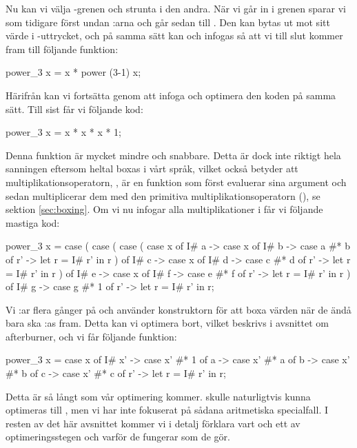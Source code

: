\documentclass[../Optimise]{subfiles}
\begin{document}
Nu kan vi välja -grenen och strunta i den andra. När vi går in i grenen
sparar vi som tidigare först undan :arna och går sedan till .
Den kan bytas ut mot sitt värde i -uttrycket, och på samma sätt  kan 
och  infogas så att vi till slut kommer fram till följande funktion:

\begin{codeEx}
power_3 x = x * power (3-1) x;
\end{codeEx}

Härifrån kan vi fortsätta genom att infoga  och optimera den
koden på samma sätt. Till sist får vi följande kod:

\begin{codeEx}
power_3 x = x * x * x * 1;
\end{codeEx}

Denna funktion är mycket mindre och snabbare.
Detta är dock inte riktigt hela sanningen eftersom heltal boxas i vårt språk, vilket
också betyder att multiplikationsoperatorn, \ic{*}, är en funktion som först
evaluerar sina argument och sedan multiplicerar dem med den primitiva 
multiplikationsoperatorn (\ic{*\#}), se sektion \ref{sec:boxing}.
Om vi nu infogar alla multiplikationer i  får vi följande mastiga kod:
\begin{codeEx}
power_3 x = case 
    ( case 
        ( case 
            ( case x of
                { I# a -> case x of
                    { I# b -> case a #* b of
                        { r' -> let r = I# r' in r}}}
            ) of
            { I# c -> case x of
                { I# d -> case c #* d of
                    { r' -> let r = I# r' in r}}}                
         ) of
         { I# e -> case x of
              { I# f -> case e #* f of
                   { r' -> let r = I# r' in r}}}
    ) of
        { I# g -> case g #* 1 of
            { r' -> let r = I# r' in r}};                                     
\end{codeEx}


Vi :ar flera gånger på  och använder konstruktorn  för att boxa värden
när de ändå bara ska :as fram.
Detta kan vi optimera bort, vilket beskrivs i avsnittet om afterburner, och vi får följande funktion:

\begin{codeEx}
power_3 x = case x of
    { I# x' -> case x' #* 1 of
        { a -> case x' #* a of
            { b -> case x' #* b of
                { c -> case x' #* c of
                    { r' -> let r = I# r' in r}}}}};
\end{codeEx}

Detta är så långt som vår optimering kommer.  skulle naturligtvis
kunna optimeras till , men vi har inte fokuserat på sådana aritmetiska
specialfall. I resten av det här avsnittet kommer vi i detalj förklara vart och
ett av optimeringsstegen och varför de fungerar som de gör.
\end{document}
